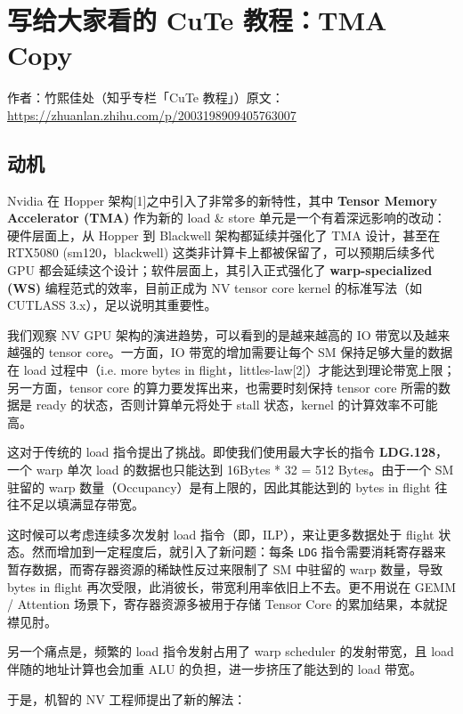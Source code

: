 \chapter{写给大家看的 CuTe 教程：TMA Copy}

\begin{center}\small 作者：竹熙佳处（知乎专栏「CuTe 教程」）\quad 原文：\url{https://zhuanlan.zhihu.com/p/2003198909405763007}\end{center}

\section{动机}

Nvidia 在 Hopper 架构[1]之中引入了非常多的新特性，其中 \textbf{Tensor Memory Accelerator (TMA)} 作为新的 load \& store 单元是一个有着深远影响的改动：硬件层面上，从 Hopper 到 Blackwell 架构都延续并强化了 TMA 设计，甚至在 RTX5080 (sm120，blackwell) 这类非计算卡上都被保留了，可以预期后续多代 GPU 都会延续这个设计；软件层面上，其引入正式强化了 \textbf{warp-specialized (WS)} 编程范式的效率，目前正成为 NV tensor core kernel 的标准写法（如 CUTLASS 3.x），足以说明其重要性。

我们观察 NV GPU 架构的演进趋势，可以看到的是越来越高的 IO 带宽以及越来越强的 tensor core。一方面，IO 带宽的增加需要让每个 SM 保持足够大量的数据在 load 过程中（i.e. more bytes in flight，littles-law[2]）才能达到理论带宽上限；另一方面，tensor core 的算力要发挥出来，也需要时刻保持 tensor core 所需的数据是 ready 的状态，否则计算单元将处于 stall 状态，kernel 的计算效率不可能高。

这对于传统的 load 指令提出了挑战。即使我们使用最大字长的指令\textbf{ LDG.128}，一个 warp 单次 load 的数据也只能达到 16Bytes * 32 = 512 Bytes。由于一个 SM 驻留的 warp 数量（Occupancy）是有上限的，因此其能达到的 bytes in flight 往往不足以填满显存带宽。

这时候可以考虑连续多次发射 load 指令（即，ILP），来让更多数据处于 flight 状态。然而增加到一定程度后，就引入了新问题：每条 \verb|LDG| 指令需要消耗寄存器来暂存数据，而寄存器资源的稀缺性反过来限制了 SM 中驻留的 warp 数量，导致 bytes in flight 再次受限，此消彼长，带宽利用率依旧上不去。更不用说在 GEMM / Attention 场景下，寄存器资源多被用于存储 Tensor Core 的累加结果，本就捉襟见肘。

另一个痛点是，频繁的 load 指令发射占用了 warp scheduler 的发射带宽，且 load 伴随的地址计算也会加重 ALU 的负担，进一步挤压了能达到的 load 带宽。

于是，机智的 NV 工程师提出了新的解法：

